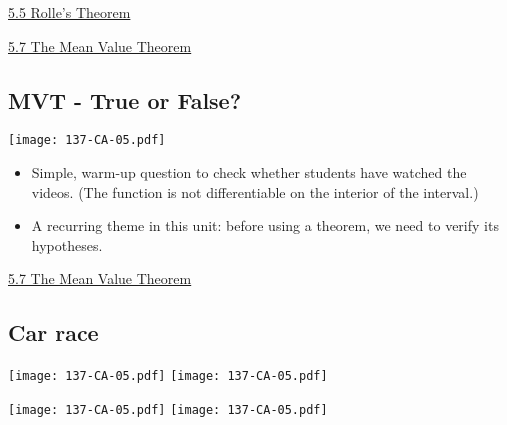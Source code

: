 \documentclass[11pt]{article}
\newcommand{\nl}{\hfill \vspace{-1.1\baselineskip}} %
\newcommand{\vv}{\hspace{8mm} \href{https://www.youtube.com/watch?v=n8Nhn7N_rkE&list=PLlwePzQY_wW9m5oabUf6hvfVfAaA9uAwM&index=5}{5.5 Rolle's Theorem}}
\newcommand{\vvii}{\hspace{8mm} \href{https://www.youtube.com/watch?v=DKFV3KMDKHc&list=PLlwePzQY_wW9m5oabUf6hvfVfAaA9uAwM&index=7}{5.7 The Mean Value Theorem}}
\begin{document}
\begin{videos}
\vv

\vvii
\end{videos}

\newpage
\subsection{MVT - True or False?}

\begin{center}
{ \texttt{[image: 137-CA-05.pdf]}} 
\end{center}


\begin{comments}
\nl
\begin{itemize}
\item  Simple, warm-up question to check whether students have watched the videos.  (The function is not differentiable on the interior of the interval.)

\item A recurring theme in this unit: before using a theorem, we need to verify its hypotheses.
\end{itemize}	
\end{comments}

\begin{videos}
\vvii
\end{videos}

\newpage
\subsection{Car race} 

\begin{center}
{ \texttt{[image: 137-CA-05.pdf]}}  \quad
{ \texttt{[image: 137-CA-05.pdf]}} 

\vspace{-2cm}

{ \texttt{[image: 137-CA-05.pdf]}}  \quad
{ \texttt{[image: 137-CA-05.pdf]}} 

\end{center}
\end{document}
